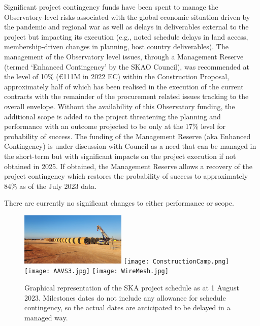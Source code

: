 \documentclass[a4paper,
               biblatex,     %
               keeplastbox,   %
               ]{jacow}
\begin{document}
Significant project contingency funds have been spent to manage the Observatory-level risks associated with the global economic situation driven by the pandemic and regional war as well as delays in deliverables external to the project but impacting its execution (e.g., noted schedule delays in land access, membership-driven changes in planning, host country deliverables). The management of the Observatory level issues, through a Management Reserve (termed ‘Enhanced Contingency’ by the SKAO Council), was recommended at the level of 10\% (€111M in 2022 EC) within the Construction Proposal, approximately half of which has been realised in the execution of the current contracts with the remainder of the procurement related issues tracking to the overall envelope. Without the availability of this Observatory funding, the additional scope is added to the project threatening the planning and performance with an outcome projected to be only at the 17\% level for probability of success. The funding of the Management Reserve (aka Enhanced Contingency) is under discussion with Council as a need that can be managed in the short-term but with significant impacts on the project execution if not obtained in 2025. If obtained, the Management Reserve allows a recovery of the project contingency which restores the probability of success to approximately 84\% as of the July 2023 data.

There are currently no significant changes to either performance or scope.

\begin{figure}[tb]
	\centering
  \includegraphics[width=0.45\textwidth]{Cables.jpg}
  \texttt{[image: ConstructionCamp.png]}\\
  \texttt{[image: AAVS3.jpg]}
  \texttt{[image: WireMesh.jpg]}
    
	\caption{
		Graphical representation of the SKA project schedule as at 1 August 2023. Milestones dates do not include any allowance for schedule contingency, so the actual dates are anticipated to be delayed in a managed way.
	}
	\label{fig:ska-timeline}
  \end{figure}
\end{document}
